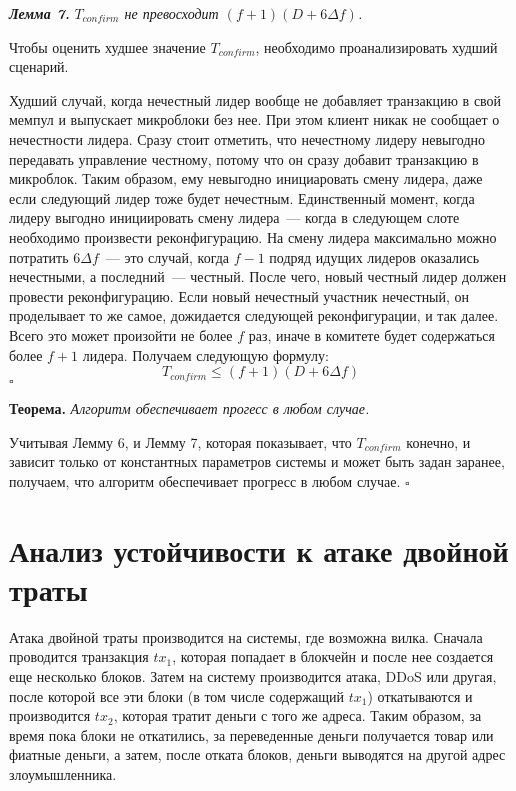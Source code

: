
\textbf{\textit{Лемма 7.}}  \textit{$T_{confirm}$ не превосходит $(f+1)(D+6\Delta f)$.}

Чтобы оценить худшее значение $T_{confirm}$, необходимо проанализировать худший сценарий.

Худший случай, когда нечестный лидер вообще не добавляет транзакцию в свой мемпул и выпускает микроблоки без нее. При этом клиент никак не сообщает о нечестности лидера. Сразу стоит отметить, что нечестному лидеру невыгодно передавать управление честному, потому что он сразу добавит транзакцию в микроблок. Таким образом, ему невыгодно инициаровать смену лидера, даже если следующий лидер тоже будет нечестным. Единственный  момент, когда лидеру выгодно инициировать смену лидера~--- когда в следующем слоте необходимо произвести реконфигурацию. На смену лидера максимально можно потратить $6\Delta f$~--- это случай, когда $f-1$ подряд идущих лидеров оказались нечестными, а последний~--- честный.
После чего, новый честный лидер должен провести реконфигурацию. Если новый нечестный участник нечестный, он проделывает то же самое, дожидается следующей реконфигурации, и так далее. Всего это может произойти не более $f$ раз, иначе в комитете будет содержаться более $f+1$ лидера. Получаем следующую формулу:
$$ T_{confirm} \le (f+1)(D+6\Delta f)$$ $\square$

\textbf{Теорема.} \textit{Алгоритм обеспечивает прогесс в любом случае.}

Учитывая Лемму 6, и Лемму 7, которая показывает, что $T_{confirm}$ конечно, и зависит только от константных параметров системы и может быть задан заранее, получаем, что алгоритм обеспечивает прогресс в любом случае. $\square$




\section{Анализ устойчивости к атаке двойной траты}
Атака двойной траты производится на системы, где возможна вилка. Сначала проводится транзакция $tx_1$, которая попадает в блокчейн и после нее создается еще несколько блоков. Затем на систему производится атака, DDoS или другая, после которой все эти блоки (в том числе содержащий $tx_1$) откатываются и производится $tx_2$, которая тратит деньги с того же адреса. Таким образом, за время пока блоки не откатились, за переведенные деньги получается товар или фиатные деньги, а затем, после отката блоков, деньги выводятся на другой адрес злоумышленника.

